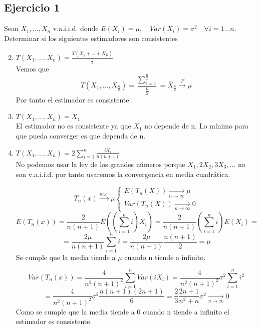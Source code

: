 \newpage
\subsection*{Ejercicio 1}

Sean $X_1, \dots, X_n$ v.a.i.i.d. donde $E(X_i)=\mu,\quad Var(X_i)=\sigma^2 \quad \forall i=1 \dots n$. Determinar si los siguientes estimadores son consistentes
\begin{enumerate}[label=\alph*)]\setcounter{enumi}{1}
    \item $T(X_1,\dots,X_n)=\frac{T(X_1 + \dots + X_{\frac{n}{2}})}{\frac{n}{2}}$\\
          Vemos que
          \[
              T(X_1,\dots,X_{\frac{n}{2}}) = \frac{\sum_{i=1}^{\frac{n}{2}}}{\frac{n}{2}} = \bar{X}_{\frac{n}{2}} \xrightarrow{P} \mu
          \]
          Por tanto el estimador es consistente

    \item $T(X_1,\dots,X_n)=X_1$\\
          El estimador no es consistente ya que $X_1$ no depende de n. Lo mínimo para que pueda converger es que dependa de n.

    \item $T(X_1,\dots,X_n)=2  \sum_{i=1}^{n}\frac{i  X_i}{n(n+1)}$\\
          No podemos usar la ley de los grandes números porque $X_1, 2X_2, 3X_3, \dots$ no son v.a.i.i.d. por tanto usaremos la convergencia en media cuadrática.

          \[
              T_n(x) \xrightarrow{m.c.} \mu
              \left\{
              \begin{array}{l}
                  E(T_n(X)) \xrightarrow[n \to \infty]{} \mu \\
                  Var(T_n(X)) \xrightarrow[n \to \infty]{} 0
              \end{array}
              \right.
          \]
          \[
              E(T_n(x))=\frac{2}{n  (n+1)}  E((\sum_{i=1}^{n} i)  X_i)=\frac{2}{n  (n+1)}  (\sum_{i=1}^{n} i)   E(X_i)=
          \]
          \[
              =\frac{2  \mu}{n  (n+1)}  \sum_{i=1}^{n} i=\frac{2  \mu}{n  (n+1)} \frac{n  (n+1)}{2}= \mu
          \]
          Se cumple que la media tiende a $\mu$ cuando n tiende a infinito.

          \[
              Var(T_n(x))=\frac{4}{n^2  (n+1)^2}  \sum_{i=1}^{n} Var(i X_i)= \frac{4}{n^2  (n+1)^2}  \sigma^2  \sum_{i=1}^{n} i^2
          \]
          \[
              =\frac{4}{n^2  (n+1)^2}  \sigma^2  \frac{n  (n+1)  (2n+1)}{6}=\frac{2}{3} \frac{2n+1}{n^2+n} \sigma^2 \xrightarrow[n \to \infty]{} 0
          \]
          Como se cumple que la media tiende a 0 cuando n tiende a infinito el estimador es consistente.
\end{enumerate}

